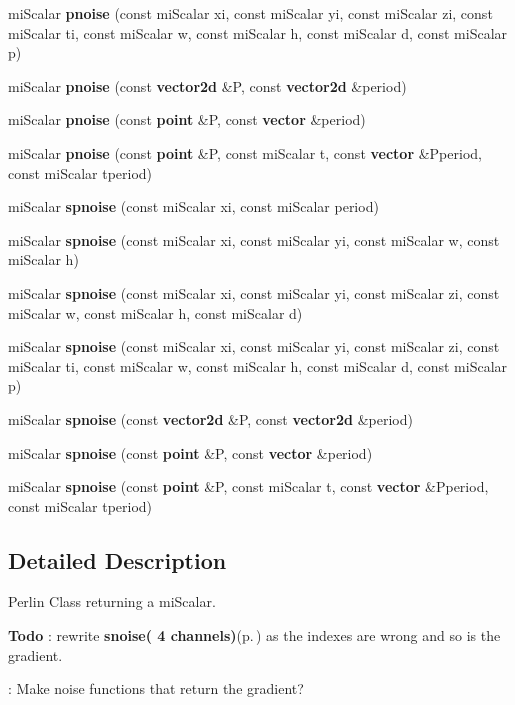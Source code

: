 \begin{CompactItemize}
\item 
mi\-Scalar {\bf pnoise} (const mi\-Scalar xi, const mi\-Scalar yi, const mi\-Scalar zi, const mi\-Scalar ti, const mi\-Scalar w, const mi\-Scalar h, const mi\-Scalar d, const mi\-Scalar p)
\item 
mi\-Scalar {\bf pnoise} (const {\bf vector2d} \&P, const {\bf vector2d} \&period)
\item 
mi\-Scalar {\bf pnoise} (const {\bf point} \&P, const {\bf vector} \&period)
\item 
mi\-Scalar {\bf pnoise} (const {\bf point} \&P, const mi\-Scalar t, const {\bf vector} \&Pperiod, const mi\-Scalar tperiod)
\item 
mi\-Scalar {\bf spnoise} (const mi\-Scalar xi, const mi\-Scalar period)
\item 
mi\-Scalar {\bf spnoise} (const mi\-Scalar xi, const mi\-Scalar yi, const mi\-Scalar w, const mi\-Scalar h)
\item 
mi\-Scalar {\bf spnoise} (const mi\-Scalar xi, const mi\-Scalar yi, const mi\-Scalar zi, const mi\-Scalar w, const mi\-Scalar h, const mi\-Scalar d)
\item 
mi\-Scalar {\bf spnoise} (const mi\-Scalar xi, const mi\-Scalar yi, const mi\-Scalar zi, const mi\-Scalar ti, const mi\-Scalar w, const mi\-Scalar h, const mi\-Scalar d, const mi\-Scalar p)
\item 
mi\-Scalar {\bf spnoise} (const {\bf vector2d} \&P, const {\bf vector2d} \&period)
\item 
mi\-Scalar {\bf spnoise} (const {\bf point} \&P, const {\bf vector} \&period)
\item 
mi\-Scalar {\bf spnoise} (const {\bf point} \&P, const mi\-Scalar t, const {\bf vector} \&Pperiod, const mi\-Scalar tperiod)
\end{CompactItemize}


\subsection{Detailed Description}
Perlin Class returning a mi\-Scalar. 

\begin{Desc}
\item[{\bf Todo}]: rewrite {\bf snoise( 4 channels)}{\rm (p.\,\pageref{mrRman__notes_8h_a14})} as the indexes are wrong and so is the gradient. 

: Make noise functions that return the gradient?\end{Desc}




